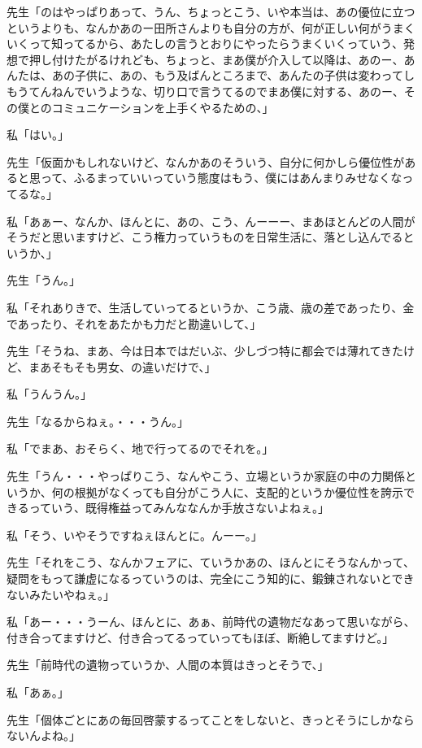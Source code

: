 \documentclass[b5j,twoside,twocolumn]{utarticle}
\begin{document}
\begin{description}
\item 先生「のはやっぱりあって、うん、ちょっとこう、いや本当は、あの優位に立つというよりも、なんかあのー田所さんよりも自分の方が、何が正しい何がうまくいくって知ってるから、あたしの言うとおりにやったらうまくいくっていう、発想で押し付けたがるけれども、ちょっと、まあ僕が介入して以降は、あのー、あんたは、あの子供に、あの、もう及ばんところまで、あんたの子供は変わってしもうてんねんでいうような、切り口で言うてるのでまあ僕に対する、あのー、その僕とのコミュニケーションを上手くやるための、」
\item 私「はい。」
\item 先生「仮面かもしれないけど、なんかあのそういう、自分に何かしら優位性があると思って、ふるまっていいっていう態度はもう、僕にはあんまりみせなくなってるな。」
\item 私「あぁー、なんか、ほんとに、あの、こう、んーーー、まあほとんどの人間がそうだと思いますけど、こう権力っていうものを日常生活に、落とし込んでるというか、」
\item 先生「うん。」
\item 私「それありきで、生活していってるというか、こう歳、歳の差であったり、金であったり、それをあたかも力だと勘違いして、」
\item 先生「そうね、まあ、今は日本ではだいぶ、少しづつ特に都会では薄れてきたけど、まあそもそも男女、の違いだけで、」
\item 私「うんうん。」
\item 先生「なるからねぇ。・・・うん。」
\item 私「でまあ、おそらく、地で行ってるのでそれを。」
\item 先生「うん・・・やっぱりこう、なんやこう、立場というか家庭の中の力関係というか、何の根拠がなくっても自分がこう人に、支配的というか優位性を誇示できるっていう、既得権益ってみんななんか手放さないよねぇ。」
\item 私「そう、いやそうですねぇほんとに。んーー。」
\item 先生「それをこう、なんかフェアに、ていうかあの、ほんとにそうなんかって、疑問をもって謙虚になるっていうのは、完全にこう知的に、鍛錬されないとできないみたいやねぇ。」
\item 私「あー・・・うーん、ほんとに、あぁ、前時代の遺物だなあって思いながら、付き合ってますけど、付き合ってるっていってもほぼ、断絶してますけど。」
\item 先生「前時代の遺物っていうか、人間の本質はきっとそうで、」
\item 私「あぁ。」
\item 先生「個体ごとにあの毎回啓蒙するってことをしないと、きっとそうにしかならないんよね。」

\end{description}
\end{document}
